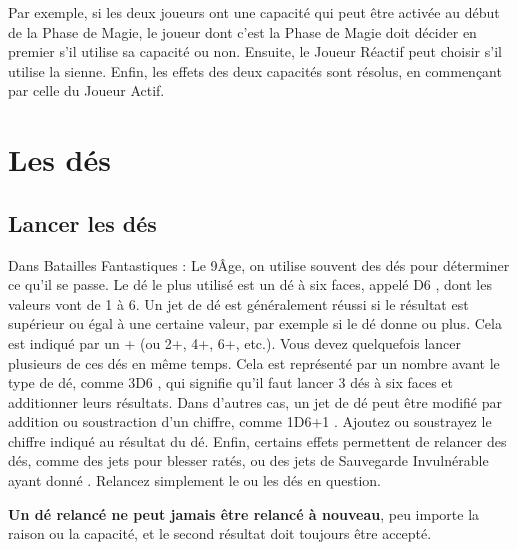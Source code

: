  Par exemple, si les deux joueurs ont une capacité qui peut être activée au début de la Phase de Magie, le joueur dont c'est la Phase de Magie doit décider en premier s'il utilise sa capacité ou non. Ensuite, le Joueur Réactif peut choisir s'il utilise la sienne. Enfin, les effets des deux capacités sont résolus, en commençant par celle du Joueur Actif.

\section{Les dés}

\subsection{Lancer les dés}

Dans Batailles Fantastiques : Le 9\ieme Âge, on utilise souvent des dés pour déterminer ce qu'il se passe. Le dé le plus utilisé est un dé à six faces, appelé \og D6 \fg{}, dont les valeurs vont de 1 à 6. Un jet de dé est généralement réussi si le résultat est supérieur ou égal à une certaine valeur, par exemple si le dé donne  ou plus. Cela est indiqué par un + \fg{} (ou 2+, 4+, 6+, etc.). Vous devez quelquefois lancer plusieurs de ces dés en même temps. Cela est représenté par un nombre avant le type de dé, comme \og 3D6 \fg{}, qui signifie qu'il faut lancer 3 dés à six faces et additionner leurs résultats. Dans d'autres cas, un jet de dé peut être modifié par addition ou soustraction d'un chiffre, comme \og 1D6+1 \fg{}. Ajoutez ou soustrayez le chiffre indiqué au résultat du dé. Enfin, certains effets permettent de relancer des dés, comme des jets pour blesser ratés, ou des jets de Sauvegarde Invulnérable ayant donné . Relancez simplement le ou les dés en question.

\textbf{Un dé relancé ne peut jamais être relancé à nouveau}, peu importe la raison ou la capacité, et le second résultat doit toujours être accepté.

